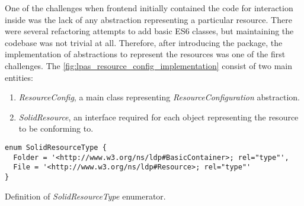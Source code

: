 One of the challenges when \lpa{} frontend initially contained the code for \solid{} interaction inside was the lack of any abstraction representing a particular \solid{} resource. There were several refactoring attempts to add basic ES6 classes, but maintaining the codebase was not trivial at all. Therefore, after introducing the \lpas{} package, the implementation of abstractions to represent the \solid{} resources was one of the first challenges. The \autoref{fig:lpas_resource_config_implementation} consist of two main entities:
\begin{enumerate}
    \item \textit{ResourceConfig}, a main class representing \textit{ResourceConfiguration} abstraction. 
    \item \textit{SolidResource}, an interface required for each object representing the \solid{} resource to be conforming to. 
\end{enumerate}

\begin{listing}[H]    
\begin{verbatim}
enum SolidResourceType {
  Folder = '<http://www.w3.org/ns/ldp#BasicContainer>; rel="type"',
  File = '<http://www.w3.org/ns/ldp#Resource>; rel="type"'
}
\end{verbatim}
\caption{Definition of \textit{SolidResourceType} enumerator.} 
\label{lst:lpas_resource_type_enum}
\end{listing}


